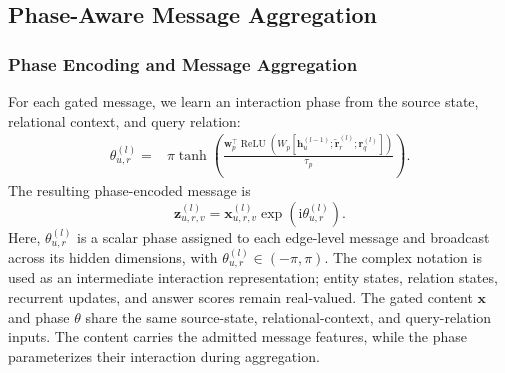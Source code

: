 \documentclass[a4paper,fleqn]{cas-dc}
\begin{document}
\subsection{Phase-Aware Message Aggregation}\label{subsec:phase-interference}

\subsubsection{Phase Encoding and Message Aggregation}

For each gated message, we learn an interaction phase from the source state, relational context, and query relation:
\begin{equation}
\begin{split}
\theta_{u,r}^{(l)}
={}&
\pi\tanh\left(
\frac{
\mathbf{w}_{p}^{\top}
\operatorname{ReLU}\left(
W_{p}\left[
\mathbf{h}_{u}^{(l-1)};
\tilde{\mathbf{r}}_{r}^{(l)};
\mathbf{r}_{q}^{(l)}
\right]
\right)
}{
\tau_p
}
\right).
\end{split}
\label{eq:evidence-phase}
\end{equation}
The resulting phase-encoded message is
\begin{equation}
\mathbf{z}_{u,r,v}^{(l)}
=
\mathbf{x}_{u,r,v}^{(l)}
\exp\left(
\mathrm{i}\theta_{u,r}^{(l)}
\right).
\label{eq:complex-relation-phase-evidence}
\end{equation}
Here, $\theta_{u,r}^{(l)}$ is a scalar phase assigned to each edge-level message and broadcast across its hidden dimensions, with $\theta_{u,r}^{(l)}\in(-\pi,\pi)$. The complex notation is used as an intermediate interaction representation; entity states, relation states, recurrent updates, and answer scores remain real-valued.
The gated content $\mathbf{x}$ and phase $\theta$ share the same source-state, relational-context, and query-relation inputs. The content carries the admitted message features, while the phase parameterizes their interaction during aggregation.
\end{document}
